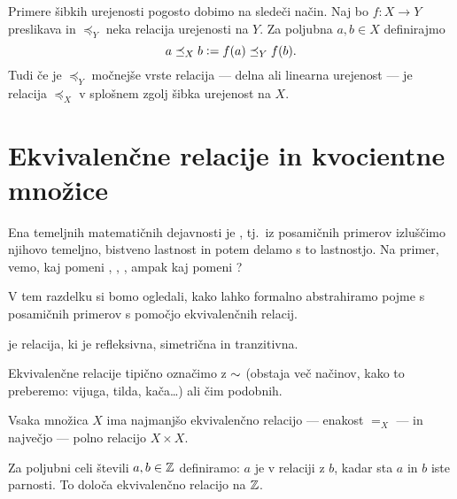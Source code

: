                 Primere šibkih urejenosti pogosto dobimo na sledeči način. Naj bo $f\colon X \to Y$ preslikava in $\preceq_Y$ neka relacija urejenosti na $Y$. Za poljubna $a, b \in X$ definirajmo
                \[a \preceq_X b \mathrel{\mathop:}= f(a) \preceq_Y f(b).\]
                Tudi če je $\preceq_Y$ močnejše vrste relacija --- delna ali linearna urejenost --- je relacija $\preceq_X$ v splošnem zgolj šibka urejenost na $X$.





        \section{Ekvivalenčne relacije in kvocientne množice}

                Ena temeljnih matematičnih dejavnosti je  , tj.~iz posamičnih primerov izluščimo njihovo temeljno, bistveno lastnost in potem delamo s to lastnostjo.  Na primer, vemo, kaj pomeni , , , ampak kaj pomeni ?

                V tem razdelku si bomo ogledali, kako lahko formalno abstrahiramo pojme s posamičnih primerov s pomočjo ekvivalenčnih relacij.

                \begin{definicija}
                         je relacija, ki je refleksivna, simetrična in tranzitivna.
                \end{definicija}

                Ekvivalenčne relacije tipično označimo z $\sim$ (obstaja več načinov, kako to preberemo: vijuga, tilda, kača\ldots) ali čim podobnih.

                \begin{zgled}
                        Vsaka množica $X$ ima najmanjšo ekvivalenčno relacijo --- enakost $=_X$ --- in največjo --- polno relacijo $X \times X$.
                \end{zgled}

                \begin{zgled}
                        Za poljubni celi števili $a, b \in \mathbb{Z}$ definiramo: $a$ je v relaciji z $b$, kadar sta $a$ in $b$ iste parnosti. To določa ekvivalenčno relacijo na $\mathbb{Z}$.
                \end{zgled}

